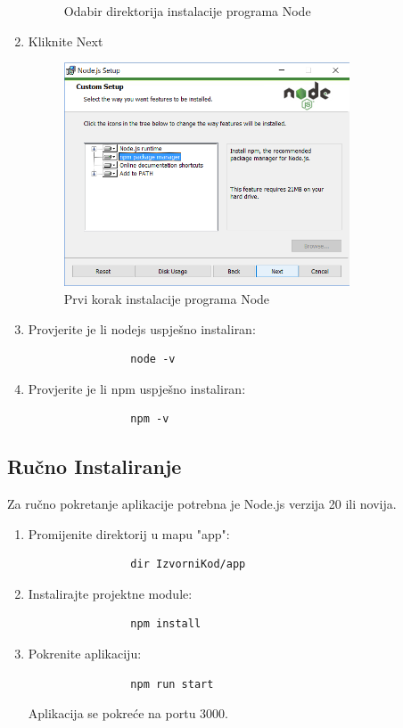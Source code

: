 \begin{enumerate}
\begin{figure}[h]
				\caption{Odabir direktorija instalacije programa Node}
			\end{figure}
			\item Kliknite Next
			\begin{figure}[h]
				\centering
				\includegraphics[width=0.8\textwidth]{slike/npm_install/3.png}
				\caption{Prvi korak instalacije programa Node}
			\end{figure}
			\item Provjerite je li nodejs uspješno instaliran:
			\begin{verbatim}
				node -v
			\end{verbatim}
			\item Provjerite je li npm uspješno instaliran:
			\begin{verbatim}
				npm -v
			\end{verbatim}
		\end{enumerate}
		\subsection*{Ručno Instaliranje}
		Za ručno pokretanje aplikacije potrebna je Node.js verzija 20 ili novija.
		\begin{enumerate}
			\item Promijenite direktorij u mapu "app":
			\begin{verbatim}
				dir IzvorniKod/app 
			\end{verbatim}
			\item Instalirajte projektne module:
			\begin{verbatim}
				npm install
			\end{verbatim}
			\item Pokrenite aplikaciju:
			\begin{verbatim}
				npm run start
			\end{verbatim}
			Aplikacija se pokreće na portu 3000.
		\end{enumerate}
		

